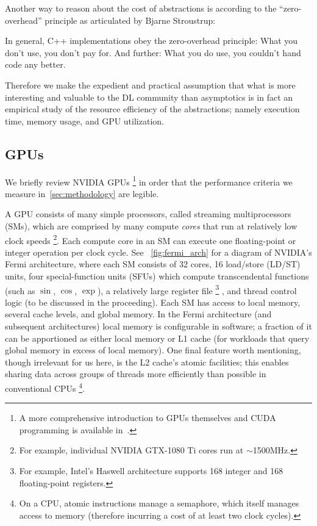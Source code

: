 Another way to reason about the cost of abstractions is according to the ``zero-overhead'' principle as articulated by Bjarne Stroustrup:
\begin{displayquote}[\cite{10.1007/978-3-642-28869-2_1}]
    In general, C++ implementations obey the zero-overhead principle: What you don’t use, you don't pay for.
    And further: What you do use, you couldn't hand code any better.
\end{displayquote}
Therefore we make the expedient and practical assumption that what is more interesting and valuable to the DL community than asymptotics is in fact an empirical study of the resource efficiency of the abstractions;
namely execution time, memory usage, and GPU utilization.



\subsection{GPUs}\label{subsec:gpus}

We briefly review NVIDIA GPUs%
\footnote{A more comprehensive introduction to GPUs themselves and CUDA programming is available in~\cite{10.5555/1891996}.}
in order that the performance criteria we measure in~\cref{sec:methodology} are legible.

A GPU consists of many simple processors, called streaming multiprocessors (SMs), which are comprised by many compute \textit{cores} that run at relatively low clock speeds%
\footnote{For example, individual NVIDIA GTX-1080 Ti cores run at $\sim$1500MHz.}.
Each compute core in an SM can execute one floating-point or integer operation per clock cycle.
See ~\cref{fig:fermi_arch} for a diagram of NVIDIA's Fermi architecture, where each SM consists of 32 cores, 16 load/store (LD/ST) units, four special-function units (SFUs) which compute transcendental functions (such as $\sin$, $\cos$, $\exp$), a relatively large register file%
\footnote{For example, Intel's Haswell architecture supports 168 integer and 168 floating-point registers.}%
, and thread control logic (to be discussed in the proceeding).
Each SM has access to local memory, several cache levels, and global memory.
In the Fermi architecture (and subsequent architectures) local memory is configurable in software;
a fraction of it can be apportioned as either local memory or L1 cache (for workloads that query global memory in excess of local memory).
One final feature worth mentioning, though irrelevant for us here, is the L2 cache's atomic  facilities;
this enables sharing data across groups of threads more efficiently than possible in conventional CPUs%
\footnote{On a CPU, atomic  instructions manage a semaphore, which itself manages access to memory (therefore incurring a cost of at least two clock cycles).}.

